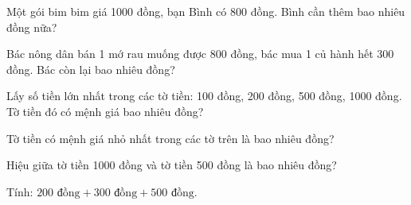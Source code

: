 \begin{ex}
Một gói bim bim giá 1000 đồng, bạn Bình có 800 đồng. Bình cần thêm bao nhiêu đồng nữa?
\end{ex}

\begin{ex}
Bác nông dân bán 1 mớ rau muống được 800 đồng, bác mua 1 củ hành hết 300 đồng. Bác còn lại bao nhiêu đồng?
\end{ex}

\begin{ex}
Lấy số tiền lớn nhất trong các tờ tiền: 100 đồng, 200 đồng, 500 đồng, 1000 đồng. Tờ tiền đó có mệnh giá bao nhiêu đồng?
\end{ex}

\begin{ex}
Tờ tiền có mệnh giá nhỏ nhất trong các tờ trên là bao nhiêu đồng?
\end{ex}

\begin{ex}
Hiệu giữa tờ tiền 1000 đồng và tờ tiền 500 đồng là bao nhiêu đồng?
\end{ex}

\begin{ex}
Tính: $200\text{ đồng} + 300\text{ đồng} + 500\text{ đồng}$.
\end{ex}
